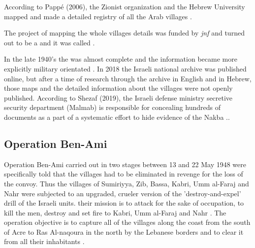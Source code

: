 According to Pappé (2006), the Zionist organization and the Hebrew University mapped and made a detailed registry of all the Arab villages \citep{Pappe2006}.



The project of mapping the whole villages details was funded by \textit{\acrfull{jnf}} and turned out to be a  and it was called \citep{Pappe2006}. 


In the late 1940's the  was almost complete and the information became more explicitly military orientated \citep{Pappe2006}. In 2018 the Israeli national archive was published online, but after a time of research through the archive in English and in Hebrew, those maps and the detailed information about the villages were not openly published. According to Shezaf (2019), the Israeli defense ministry secretive security department (Malmab) is responsible for concealing hundreds of documents as a part of a systematic effort to hide evidence of the Nakba \citep{Shezaf2019}.\citep{Shezaf2019}.


\subsection{Operation Ben-Ami}

Operation Ben-Ami carried out in two stages between 13 and 22 May 1948
were specifically told that the villages had to be eliminated in revenge for the
loss of the convoy. Thus the villages of Sumiriyya, Zib, Bassa, Kabri, Umm
al-Faraj and Nahr were subjected to an upgraded, crueler version of
the 'destroy-and-expel' drill of the Israeli units. their mission is to attack for
the sake of occupation, to kill the men, destroy and set fire to Kabri, Umm
al-Faraj and Nahr \citep{Pappe2006}. The operation objective is to capture all of the villages along the coast from the south of Acre to Ras Al-naqoura in the north by the Lebanese borders and to clear it from all their inhabitants \citep{Morris2004, Morris2008}.

